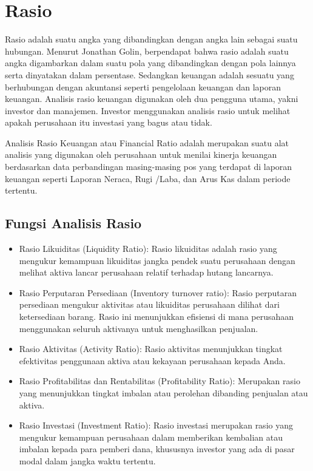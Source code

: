 \documentclass[
]{book}
\providecommand{\tightlist}{%
  \setlength{\itemsep}{0pt}\setlength{\parskip}{0pt}}
\begin{document}
\hypertarget{rasio}{%
\section{Rasio}\label{rasio}}

Rasio adalah suatu angka yang dibandingkan dengan angka lain sebagai suatu hubungan. Menurut Jonathan Golin, berpendapat bahwa rasio adalah suatu angka digambarkan dalam suatu pola yang dibandingkan dengan pola lainnya serta dinyatakan dalam persentase. Sedangkan keuangan adalah sesuatu yang berhubungan dengan akuntansi seperti pengelolaan keuangan dan laporan keuangan. Analisis rasio keuangan digunakan oleh dua pengguna utama, yakni investor dan manajemen. Investor menggunakan analisis rasio untuk melihat apakah perusahaan itu investasi yang bagus atau tidak.

Analisis Rasio Keuangan atau Financial Ratio adalah merupakan suatu alat analisis yang digunakan oleh perusahaan untuk menilai kinerja keuangan berdasarkan data perbandingan masing-masing pos yang terdapat di laporan keuangan seperti Laporan Neraca, Rugi /Laba, dan Arus Kas dalam periode tertentu.

\hypertarget{fungsi-analisis-rasio}{%
\subsection{Fungsi Analisis Rasio}\label{fungsi-analisis-rasio}}

\begin{itemize}
\tightlist
\item
  Rasio Likuiditas (Liquidity Ratio): Rasio likuiditas adalah rasio yang mengukur kemampuan likuiditas jangka pendek suatu perusahaan dengan melihat aktiva lancar perusahaan relatif terhadap hutang lancarnya.
\item
  Rasio Perputaran Persediaan (Inventory turnover ratio): Rasio perputaran persediaan mengukur aktivitas atau likuiditas perusahaan dilihat dari ketersediaan barang. Rasio ini menunjukkan efisiensi di mana perusahaan menggunakan seluruh aktivanya untuk menghasilkan penjualan.
\item
  Rasio Aktivitas (Activity Ratio): Rasio aktivitas menunjukkan tingkat efektivitas penggunaan aktiva atau kekayaan perusahaan kepada Anda.
\item
  Rasio Profitabilitas dan Rentabilitas (Profitability Ratio): Merupakan rasio yang menunjukkan tingkat imbalan atau perolehan dibanding penjualan atau aktiva.
\item
  Rasio Investasi (Investment Ratio): Rasio investasi merupakan rasio yang mengukur kemampuan perusahaan dalam memberikan kembalian atau imbalan kepada para pemberi dana, khususnya investor yang ada di pasar modal dalam jangka waktu tertentu.
\end{itemize}
\end{document}
